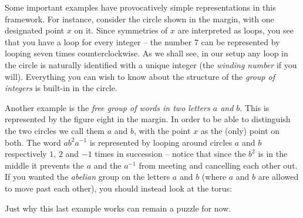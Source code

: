 Some important examples have provocatively simple representations in
this framework.  For instance, consider the circle shown in the margin,
with one designated point $x$ on it.
Since symmetries of $x$ are interpreted as loops, you see that you have a loop for every integer -- the number $7$ can be represented by looping seven times counterclockwise.  As we shall see, in our setup any loop in the circle is naturally identified with a unique integer (the \emph{winding number} if you will).  Everything you can wish to know about the structure of the \emph{group of integers} is built-in in the circle.

Another example is the \emph{free group of words in two letters $a$ and $b$}.  This is represented by the figure eight in the margin.
In order to be able to distinguish the two circles we call them $a$ and $b$,
with the point $x$ as the (only) point on both.
The word $ab^2a^{-1}$ is represented by looping around circles $a$ and $b$ respectively $1$, $2$ and $-1$ times in succession -- notice that since the $b^2$ is in the middle it prevents the $a$ and the $a^{-1}$ from meeting and cancelling each other out.  If you wanted the \emph{abelian} group on the letters $a$ and $b$ (where $a$ and $b$ are allowed to move past each other), you should instead look at the torus:
\begin{center}
\end{center}
Just why this last example works can remain a puzzle for now.

